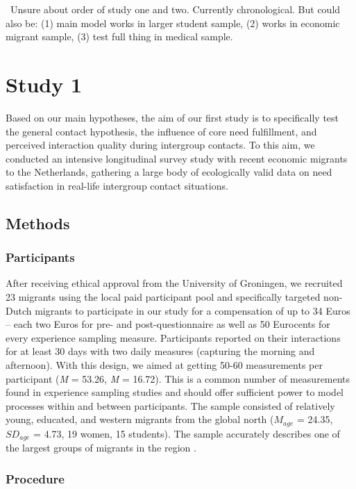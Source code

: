 \faQuestionCircle~Unsure about order of study one and two. Currently
chronological. But could also be: (1) main model works in larger student
sample, (2) works in economic migrant sample, (3) test full thing in
medical sample.

\section{Study 1}

Based on our main hypotheses, the aim of our first study is to
specifically test the general contact hypothesis, the influence of core
need fulfillment, and perceived interaction quality during intergroup
contacts. To this aim, we conducted an intensive longitudinal survey
study with recent economic migrants to the Netherlands, gathering a
large body of ecologically valid data on need satisfaction in real-life
intergroup contact situations.

\subsection{Methods}

\subsubsection{Participants}

After receiving ethical approval from the University of Groningen, we
recruited 23 migrants using the local paid participant pool and
specifically targeted non-Dutch migrants to participate in our study for
a compensation of up to 34 Euros -- each two Euros for pre- and
post-questionnaire as well as 50 Eurocents for every experience sampling
measure. Participants reported on their interactions for at least 30
days with two daily measures (capturing the morning and afternoon). With
this design, we aimed at getting 50-60 measurements per participant
(\textit{M} = 53.26, \textit{M} = 16.72). This is a common number of
measurements found in experience sampling studies
\citep[e.g., for a systematic review see][]{AanhetRot2012} and should
offer sufficient power to model processes within and between
participants. The sample consisted of relatively young, educated, and
western migrants from the global north (\(M_{age}\) = 24.35,
\(SD_{age}\) = 4.73, 19 women, 15 students). The sample accurately
describes one of the largest groups of migrants in the region
\citep[][]{GemeenteGroningen2015}.

\subsubsection{Procedure}

